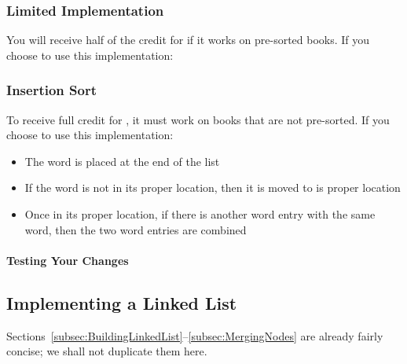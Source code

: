     \subsubsection{Limited Implementation}

        You will receive half of the credit for  if it works on pre-sorted books.
        If you choose to use this implementation:
        \begin{description}
        \end{description}

    \subsubsection{Insertion Sort} \label{subsec:tldrInsertionSort}

        To receive full credit for , it must work on books that are not pre-sorted.
        If you choose to use this implementation:
        \begin{description}
            \begin{itemize}
                \item The word is placed at the end of the list
                \item If the word is not in its proper location, then it is moved to is proper location
                \item Once in its proper location, if there is another word entry with the same word, then the two word entries are combined
            \end{itemize}
        \end{description}

    \paragraph{Testing Your Changes}

        \begin{description}
        \end{description}


\subsection{Implementing a Linked List}

    Sections~\ref{subsec:BuildingLinkedList}--\ref{subsec:MergingNodes} are already fairly concise;
    we shall not duplicate them here.


